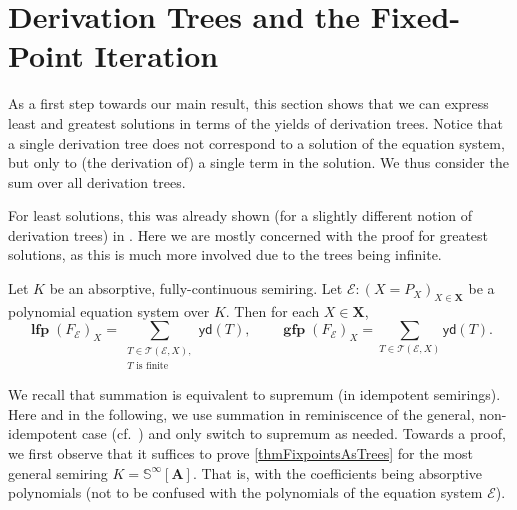 \documentclass[english,runningheads,a4paper,envcountsame]{llncs}
\DeclareMathOperator{\lfp}{\mathbf{lfp}}
\DeclareMathOperator{\gfp}{\mathbf{gfp}}
\newcommand{\Sinf}{{\mathbb S}^{\infty}}
\newcommand*{\XX}{{\bm X}}
\newcommand*{\EE}{\mathcal{E}}
\renewcommand{\AA}{{\bm A}}
\newcommand*{\yield}{\mathsf{yd}}
\newcommand*{\Trees}{\mathcal{T}}
\newcommand*{\co}{\colon}
\begin{document}
\section{Derivation Trees and the Fixed-Point Iteration}

As a first step towards our main result, this section shows that we can express least and greatest solutions in terms of the yields of derivation trees.
Notice that a single derivation tree does not correspond to a solution of the equation system, but only to (the derivation of) a single term in the solution.
We thus consider the sum over all derivation trees.

For least solutions, this was already shown (for a slightly different notion of derivation trees) in \cite{Newton}.
Here we are mostly concerned with the proof for greatest solutions, as this is much more involved due to the trees being infinite.

\begin{theorem}\label{thmFixpointsAsTrees}
Let $K$ be an absorptive, fully-continuous semiring.
Let $\EE \co (X = P_X)_{X \in \XX}$ be a polynomial equation system over $K$.
Then for each $X \in \XX$,
\[
\lfp(F_\EE)_X = \sum_{\substack{T \in \Trees(\EE, X),\\T \text{ is finite}}} \yield(T), \qquad
\gfp(F_\EE)_X = \sum_{T \in \Trees(\EE, X)} \yield(T).
\]
\end{theorem}

We recall that summation is equivalent to supremum (in idempotent semirings).
Here and in the following, we use summation in reminiscence of the general, non-idempotent case (cf.\ \cite{Newton}) and only switch to supremum as needed.
%
Towards a proof, we first observe that it suffices to prove \cref{thmFixpointsAsTrees} for the most general semiring $K = \Sinf[\AA]$. That is, with the coefficients being absorptive polynomials (not to be confused with the polynomials of the equation system $\EE$).
\end{document}
